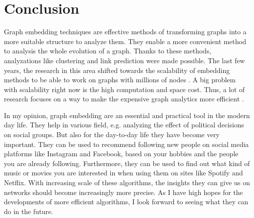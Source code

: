\documentclass[sigconf]{acmart}
\begin{document}
\section{Conclusion}
Graph embedding techniques are effective methods of transforming graphs into a more suitable structure to analyze them. They enable a more convenient method to analysis the whole evolution of a graph.
Thanks to these methods, analyzations like clustering and link prediction were made possible.
The last few years, the research in this area shifted towards the scalability of embedding methods to be able to work on graphs with millions of nodes \cite{Bruss.03.07.2019}.
A big problem with scalability right now is the high computation and space cost. Thus, a lot of research focuses on a way to make the expensive graph analytics more efficient \cite{Cai.22.09.2017}.


In my opinion, graph embedding are an essential and practical tool in the modern day life. They help in various field, e.g. analyzing the effect of political decisions on social groups. 
But also for the day-to-day life they have become very important. They can be used to recommend following new people on social media platforms like Instagram and Facebook, based on your hobbies and the people you are already following.
Furthermore, they can be used to find out what kind of music or movies you are interested in when using them on sites like Spotify and Netflix. 
With increasing scale of these algorithms, the insights they can give us on networks should become increasingly more precise. As I have high hopes for the developments of more efficient algorithms, I look forward to seeing what they can do in the future.



\end{document}
